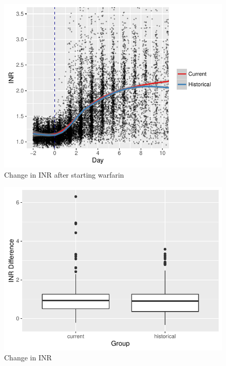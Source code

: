 \documentclass[]{article}
\begin{document}
\begin{figure}[H]
\centering
\includegraphics{warfarin_analysis_ASHP_files/figure-latex/inr_hist-1.pdf}
\caption{Change in INR after starting warfarin}
\end{figure}

\begin{figure}[H]
\centering
\includegraphics{warfarin_analysis_ASHP_files/figure-latex/inr2_hist-1.pdf}
\caption{Change in INR}
\end{figure}
\end{document}

